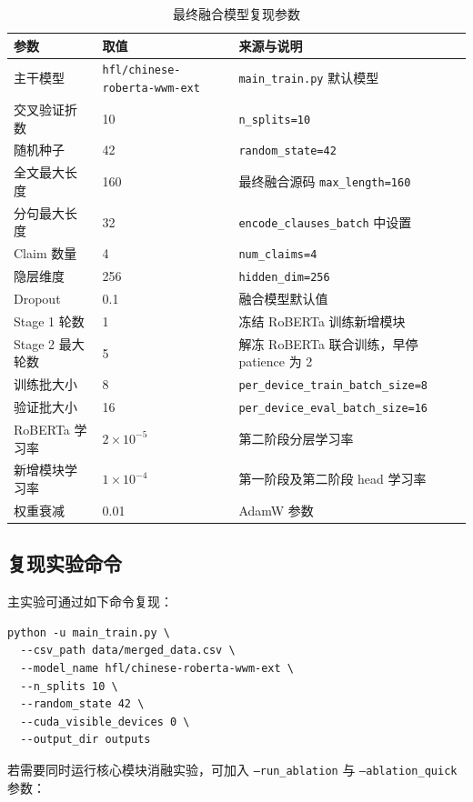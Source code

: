 \documentclass[UTF8,oneside,openright,fontset=none]{ctexbook}
\numberwithin{equation}{chapter}
\begin{document}
\begin{table}[htbp]
  \centering
  \small
  \caption{最终融合模型复现参数}
  \label{tab:appendix-train-params}
  \begin{tabular}{lll}
    \toprule
    参数 & 取值 & 来源与说明 \\
    \midrule
    主干模型 & \texttt{hfl/chinese-roberta-wwm-ext} & \texttt{main\_train.py} 默认模型 \\
    交叉验证折数 & 10 & \texttt{n\_splits=10} \\
    随机种子 & 42 & \texttt{random\_state=42} \\
    全文最大长度 & 160 & 最终融合源码 \texttt{max\_length=160} \\
    分句最大长度 & 32 & \texttt{encode\_clauses\_batch} 中设置 \\
    Claim 数量 & 4 & \texttt{num\_claims=4} \\
    隐层维度 & 256 & \texttt{hidden\_dim=256} \\
    Dropout & 0.1 & 融合模型默认值 \\
    Stage 1 轮数 & 1 & 冻结 RoBERTa 训练新增模块 \\
    Stage 2 最大轮数 & 5 & 解冻 RoBERTa 联合训练，早停 patience 为 2 \\
    训练批大小 & 8 & \texttt{per\_device\_train\_batch\_size=8} \\
    验证批大小 & 16 & \texttt{per\_device\_eval\_batch\_size=16} \\
    RoBERTa 学习率 & $2\times10^{-5}$ & 第二阶段分层学习率 \\
    新增模块学习率 & $1\times10^{-4}$ & 第一阶段及第二阶段 head 学习率 \\
    权重衰减 & 0.01 & AdamW 参数 \\
    \bottomrule
  \end{tabular}
\end{table}

\subsection{复现实验命令}
主实验可通过如下命令复现：

\begin{verbatim}
python -u main_train.py \
  --csv_path data/merged_data.csv \
  --model_name hfl/chinese-roberta-wwm-ext \
  --n_splits 10 \
  --random_state 42 \
  --cuda_visible_devices 0 \
  --output_dir outputs
\end{verbatim}

若需要同时运行核心模块消融实验，可加入 \texttt{--run\_ablation} 与 \texttt{--ablation\_quick} 参数：
\end{document}
